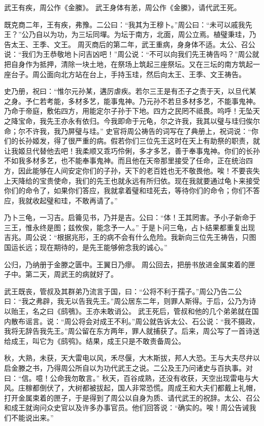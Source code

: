 \documentclass[12pt,UTF8]{ctexbook}
\begin{document}
武王有疾，周公作《金縢》。
武王身体有恙，周公作《金縢》，请代武王死。

既克商二年，王有疾，弗豫。二公曰：“我其为王穆卜。”周公曰：“未可以戚我先王？”公乃自以为功，为三坛同墠。为坛于南方，北面，周公立焉。植璧秉珪，乃告太王、王季、文王。
周灭商后的第二年，武王重病，身身体不适。太公、召公说：“我们为王恭敬地卜问吉凶吧！”周公说：“不可以向我们先王祷告吗？”周公就把自身作为抵押，清除一块土地，在祭场上筑起三座祭坛。又在三坛的南方筑起一座台子。周公面向北方站在台上，手持玉珪，然后向太王、王季、文王祷告。

史乃册，祝曰：“惟尔元孙某，遘厉虐疾。若尔三王是有丕子之责于天，以旦代某之身。予仁若考能，多材多艺，能事鬼神。乃元孙不若旦多材多艺，不能事鬼神。乃命于帝庭，敷佑四方，用能定尔子孙于下地。四方之民罔不祗畏。呜呼！无坠天之降宝命，我先王亦永有依归。今我即命于元龟，尔之许我，我其以璧与珪归俟尔命；尔不许我，我乃屏璧与珪。”
史官将周公祷告的词写在了典册上，祝词说：“你们的长孙姬发，得了很严重的病。假若你们三位先王这时在天上有助祭的职责，就让我姬旦代替他去吧！我柔顺又乖巧伶俐，多才多艺，善于奉事鬼神。你们的长孙不如我多材多艺，也不能奉事鬼神。而且他在天帝那里接受了任命，正在统治四方，因此能够在人间安定你们的子孙，天下的老百姓也无不敬畏他。唉！不要丧失上天降给的宝贵使命，我们的先王也就永远有所归依。现在我就要通过龟卜来接受你们的命令了，如果你们答应，我就拿着璧和珪死去，等待你们的命令；你们不答应，我就收起璧和珪，不敢再请了。”

乃卜三龟，一习吉。启籥见书，乃并是吉。公曰：“体！王其罔害。予小子新命于三王，惟永终是图；兹攸俟，能念予一人。”
于是卜问三龟，占卜结果都重复出现吉兆。周公说：“根据兆形，王的病不会有什么危险。我新向三位先王祷告，只图国运长远；现在期待的，是先王能够俯念我的诚心。”

公归，乃纳册于金滕之匮中。王翼日乃瘳。
周公回去，把册书放进金属束着的匣子中。第二天，周武王的病就好了。

武王既丧，管叔及其群弟乃流言于国，曰：“公将不利于孺子。”周公乃告二公曰：“我之弗辟，我无以告我先王。”周公居东二年，则罪人斯得。于后，公乃为诗以贻王，名之曰《鸱鴞》。王亦未敢诮公。
武王死后，管叔和他的几个弟弟就在国内散布谣言。说：“周公将会对成王不利。”周公就告诉太公、石公说：“我不摄政，我将无辞告我先王。”周公留在东方两年，罪人就捕获了。后来，周公写了一首诗送给成王，叫它为《鸱鸮》。结果，成王只是不敢责备周公。

秋，大熟，未获，天大雷电以风，禾尽偃，大木斯拔，邦人大恐。王与大夫尽弁以启金滕之书，乃得周公所自以为功代武王之说。二公及王乃问诸史与百执事。对曰：“信。噫！公命我勿敢言。”
秋天，百谷成熟，还没有收获，天空出现雷电与大风。庄稼都倒伏了，大树都被拔起，国人非常恐慌。周成王和大夫们都戴上礼帽，打开金属束着的匣子，于是得到了周公以自身为质、请代武王的祝辞。太公、召公和成王就询问众史官以及许多办事官员。他们回答说：“确实的。唉！周公告诫我们不能说出来。”
\end{document}
